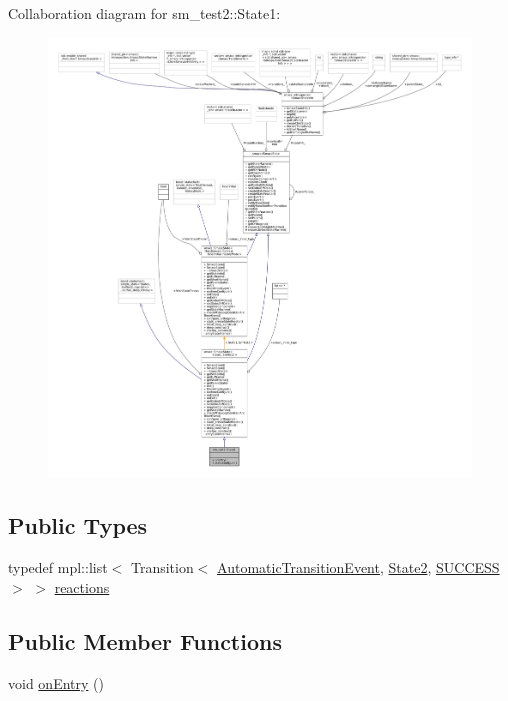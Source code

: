 Collaboration diagram for sm\+\_\+test2\+:\+:State1\+:
\nopagebreak
\begin{figure}[H]
\begin{center}
\leavevmode
\includegraphics[width=350pt]{structsm__test2_1_1State1__coll__graph}
\end{center}
\end{figure}
\subsection*{Public Types}
\begin{DoxyCompactItemize}
\item 
typedef mpl\+::list$<$ Transition$<$ \hyperlink{structsm__test2_1_1AutomaticTransitionEvent}{Automatic\+Transition\+Event}, \hyperlink{structsm__test2_1_1State2}{State2}, \hyperlink{classSUCCESS}{S\+U\+C\+C\+E\+SS} $>$ $>$ \hyperlink{structsm__test2_1_1State1_a8c6681c606915f444d9286235745b312}{reactions}
\end{DoxyCompactItemize}
\subsection*{Public Member Functions}
\begin{DoxyCompactItemize}
\item 
void \hyperlink{structsm__test2_1_1State1_a1681290d4b5b0480dccbf80848026611}{on\+Entry} ()
\end{DoxyCompactItemize}
